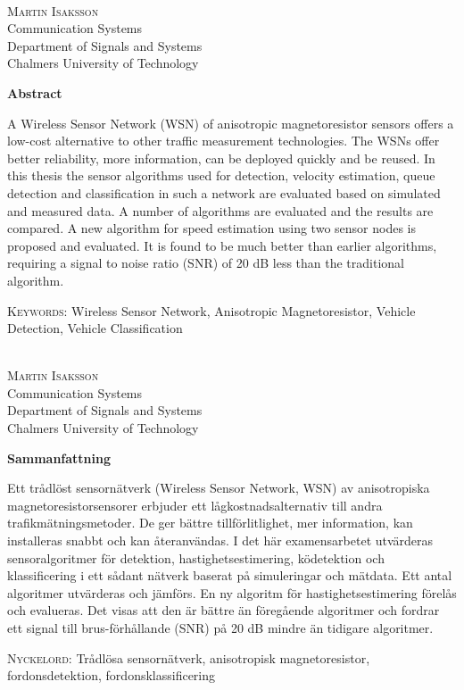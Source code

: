 \cleardoublepage
{}
\setcounter{page}{1}
\thispagestyle{plain}
\thesistitle\\
\textsc{Martin Isaksson}\\
Communication Systems\\
Department of Signals and Systems\\
Chalmers University of Technology\\

{\Huge \bfseries Abstract\par\nobreak
    \vskip 40pt}

A Wireless Sensor Network (WSN) of anisotropic magnetoresistor sensors offers a low-cost alternative to other traffic measurement technologies. The WSNs offer better reliability, more information, can be deployed quickly and be reused. In this thesis the sensor algorithms used for detection, velocity estimation, queue detection and classification in such a network are evaluated based on simulated and measured data. A number of algorithms are evaluated and the results are compared. A new algorithm for speed estimation using two sensor nodes is proposed and evaluated. It is found to be much better than earlier algorithms, requiring a signal to noise ratio (SNR) of 20 dB less than the traditional algorithm.

\vspace{1.5cm}
\textsc{Keywords:} Wireless Sensor Network, Anisotropic Magnetoresistor, Vehicle Detection, Vehicle Classification

\cleardoublepage
{}
\thesistitle\\
\textsc{Martin Isaksson}\\
Communication Systems\\
Department of Signals and Systems\\
Chalmers University of Technology\\

{\Huge \bfseries Sammanfattning\par\nobreak
\vskip 40pt}
\thispagestyle{plain}


Ett tr\aa{}dl\"{o}st sensorn\"{a}tverk (Wireless Sensor Network, WSN) av anisotropiska magnetoresistorsensorer erbjuder ett l\aa{}gkostnadsalternativ till andra trafikm\"{a}tningsmetoder. De ger b\"{a}ttre tillf\"{o}rlitlighet, mer information, kan installeras snabbt och kan \aa{}teranv\"{a}ndas. I det h\"{a}r examensarbetet utv\"{a}rderas sensoralgoritmer f\"{o}r detektion, hastighetsestimering, k\"{o}detektion och klassificering i ett s\aa{}dant n\"{a}tverk baserat p\aa{} simuleringar och m\"{a}tdata. Ett antal algoritmer utv\"{a}rderas och j\"{a}mf\"{o}rs. En ny algoritm f\"{o}r hastighetsestimering f\"{o}rel\aa{}s och evalueras. Det visas att den \"{a}r b\"{a}ttre \"{a}n f\"{o}reg\aa{}ende algoritmer och fordrar ett signal till brus-f\"{o}rh\aa{}llande (SNR) p\aa{} 20 dB mindre \"{a}n tidigare algoritmer.

\vspace{1.5cm}
\textsc{Nyckelord:} Tr\aa{}dl\"{o}sa sensorn\"{a}tverk, anisotropisk magnetoresistor, fordonsdetektion, fordonsklassificering
\newpage